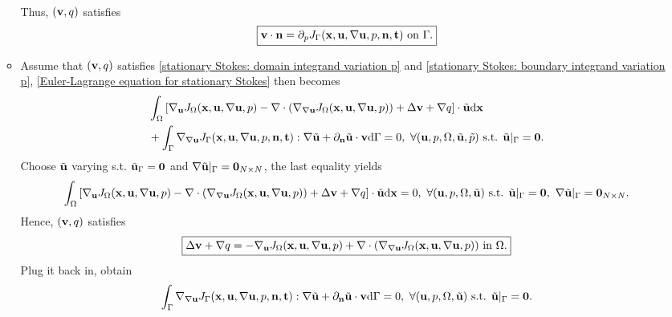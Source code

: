 \documentclass[oneside]{book}
\numberwithin{equation}{section}
\begin{document}
\begin{itemize}
\begin{itemize}
\begin{align*}
        \end{align*}
        Thus, $({\bf v},q)$ satisfies
        \begin{align}
            \label{stationary Stokes: boundary integrand variation p}
            \boxed{{\bf v}\cdot{\bf n} = \partial_pJ_\Gamma({\bf x},{\bf u},\nabla{\bf u},p,{\bf n},{\bf t}) \mbox{ on } \Gamma.}
        \end{align}
        \item Assume that $({\bf v},q)$ satisfies \eqref{stationary Stokes: domain integrand variation p} and \eqref{stationary Stokes: boundary integrand variation p}, \eqref{Euler-Lagrange equation for stationary Stokes} then becomes
        \begin{align*}
            &\int_\Omega \left[\nabla_{\bf u}J_\Omega({\bf x},{\bf u},\nabla{\bf u},p) - \nabla\cdot(\nabla_{\nabla{\bf u}}J_\Omega({\bf x},{\bf u},\nabla{\bf u},p)) + \Delta{\bf v} + \nabla q\right]\cdot\tilde{\bf u} {\rm d}{\bf x}\nonumber\\
            &+ \int_\Gamma \nabla_{\nabla{\bf u}}J_\Gamma({\bf x},{\bf u},\nabla{\bf u},p,{\bf n},{\bf t}):\nabla\tilde{\bf u} + \partial_{\bf n}\tilde{\bf u}\cdot{\bf v}{\rm d}\Gamma = 0,\ \forall({\bf u},p,\Omega,\tilde{\bf u},\tilde{p}) \mbox{ s.t. } \tilde{\bf u}|_\Gamma = {\bf 0}.
        \end{align*}
        Choose $\tilde{\bf u}$ varying s.t. $\tilde{\bf u}_\Gamma = {\bf 0}$ and $\nabla\tilde{\bf u}|_\Gamma = {\bf 0}_{N\times N}$, the last equality yields
        \begin{align*}
            \int_\Omega \left[\nabla_{\bf u}J_\Omega({\bf x},{\bf u},\nabla{\bf u},p) - \nabla\cdot(\nabla_{\nabla{\bf u}}J_\Omega({\bf x},{\bf u},\nabla{\bf u},p)) + \Delta{\bf v} + \nabla q\right]\cdot\tilde{\bf u} {\rm d}{\bf x} = 0,\ \forall({\bf u},p,\Omega,\tilde{\bf u}) \mbox{ s.t. } \tilde{\bf u}|_\Gamma = {\bf 0},\ \nabla\tilde{\bf u}|_\Gamma = {\bf 0}_{N\times N}.
        \end{align*}
        Hence, $({\bf v},q)$ satisfies
        \begin{align}
            \label{stationary Stokes: domain integrand variation u}
            \boxed{\Delta{\bf v} + \nabla q = -\nabla_{\bf u}J_\Omega({\bf x},{\bf u},\nabla{\bf u},p) + \nabla\cdot(\nabla_{\nabla{\bf u}}J_\Omega({\bf x},{\bf u},\nabla{\bf u},p)) \mbox{ in } \Omega.}
        \end{align}
        Plug it back in, obtain
        \begin{align*}
            \int_\Gamma \nabla_{\nabla{\bf u}}J_\Gamma({\bf x},{\bf u},\nabla{\bf u},p,{\bf n},{\bf t}):\nabla\tilde{\bf u} + \partial_{\bf n}\tilde{\bf u}\cdot{\bf v}{\rm d}\Gamma = 0,\ \forall({\bf u},p,\Omega,\tilde{\bf u}) \mbox{ s.t. } \tilde{\bf u}|_\Gamma = {\bf 0}.

\end{align*}
\end{itemize}
\end{itemize}
\end{document}

